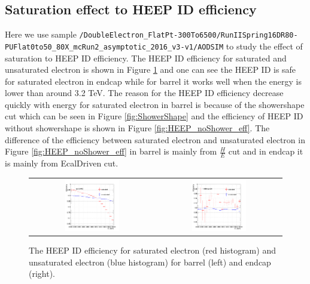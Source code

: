 \subsection{Saturation effect to HEEP ID efficiency}
\label{HEEP_effect}
Here we use sample \texttt{/DoubleElectron\_FlatPt-300To6500/RunIISpring16DR80-\\PUFlat0to50\_80X\_mcRun2\_asymptotic\_2016\_v3-v1/AODSIM} to study the effect of saturation to HEEP ID efficiency.
The HEEP ID efficiency for saturated and unsaturated electron is shown in
Figure \ref{fig:HEEP_eff} and one can see the HEEP ID is safe for saturated
electron in endcap while for barrel it works well when the energy is lower than
around 3.2 TeV. The reason for the HEEP ID efficiency decrease quickly with energy for saturated electron in barrel is because of the showershape cut which can be seen in Figure \ref{fig:ShowerShape} and the efficiency of HEEP ID without showershape is shown in Figure \ref{fig:HEEP_noShower_eff}. The difference of the efficiency between saturated electron and unsaturated electron in Figure \ref{fig:HEEP_noShower_eff} in barrel is mainly from $\frac{H}{E}$ cut and in endcap it is mainly from EcalDriven cut.

\begin{figure}[bh]
  \begin{center}
    \begin{tabular}{cc}
      \includegraphics[width=0.45\textwidth]{chapters/Zprime/Saturation/images/FlatPt/compare_s_nos/nominal_HEEP_eff/compare_HEEP_eff_Barrel.png} &
      \includegraphics[width=0.45\textwidth]{chapters/Zprime/Saturation/images/FlatPt/compare_s_nos/nominal_HEEP_eff/compare_HEEP_eff_Endcap.png} \\
    \end{tabular}
    \caption{ The HEEP ID efficiency for saturated electron (red histogram) and unsaturated electron (blue histogram) for barrel (left) and endcap (right).}
    \label{fig:HEEP_eff}
  \end{center}
\end{figure}

